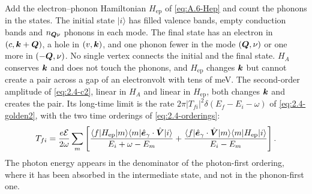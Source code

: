Add the electron--phonon Hamiltonian $H_{\mathrm{ep}}$ of \cref{eq:A.6-Hep} and count the phonons in the states. The initial state $|i\rangle$ has filled valence bands, empty conduction bands and $n_{\bm{Q}\nu}$ phonons in each mode. The final state has an electron in $(c,\bm{k}+\bm{Q})$, a hole in $(v,\bm{k})$, and one phonon fewer in the mode $(\bm{Q},\nu)$ or one more in $(-\bm{Q},\nu)$. No single vertex connects the initial and the final state. $H_A$ conserves $\bm{k}$ and does not touch the phonons, and $H_{\mathrm{ep}}$ changes $\bm{k}$ but cannot create a pair across a gap of an electronvolt with tens of meV. The second-order amplitude of \cref{eq:2.4-c2}, linear in $H_A$ and linear in $H_{\mathrm{ep}}$, both changes $\bm{k}$ and creates the pair. Its long-time limit is the rate $2\pi|T_{fi}|^2\delta(E_f - E_i - \omega)$ of \cref{eq:2.4-golden2}, with the two time orderings of \cref{eq:2.4-orderings}:
\begin{equation*}
  T_{fi} = \frac{e\mathcal{E}}{2\omega}\sum_m\left[\frac{\langle f|H_{\mathrm{ep}}|m\rangle\langle m|\hat{\bm{e}}_\gamma\cdot\hat{\bm{V}}|i\rangle}{E_i + \omega - E_m} + \frac{\langle f|\hat{\bm{e}}_\gamma\cdot\hat{\bm{V}}|m\rangle\langle m|H_{\mathrm{ep}}|i\rangle}{E_i - E_m}\right] .
\end{equation*}
The photon energy appears in the denominator of the photon-first ordering, where it has been absorbed in the intermediate state, and not in the phonon-first one.

